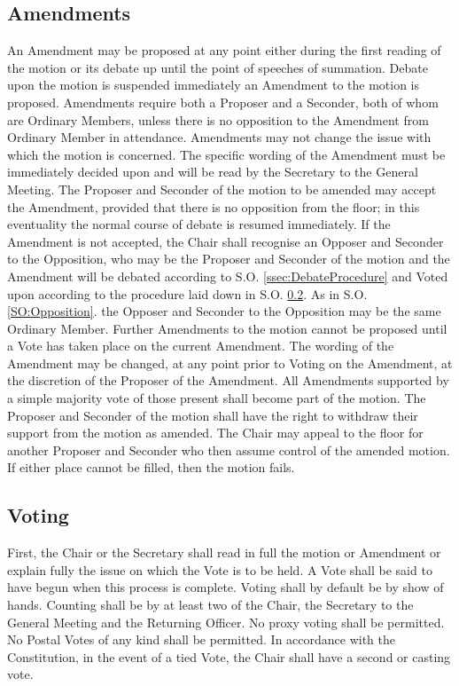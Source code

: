 \subsection{Amendments} \label{ssec:MotionAmendment}
\npara An Amendment may be proposed at any point either during the first reading of the motion or its debate up until the point of speeches of summation.
\npara Debate upon the motion is suspended immediately an Amendment to the motion is proposed.
\npara Amendments require both a Proposer and a Seconder, both of whom are Ordinary Members, unless there is no opposition to the Amendment from Ordinary Member in attendance.
\npara Amendments may not change the issue with which the motion is concerned.
\npara The specific wording of the Amendment must be immediately decided upon and will be read by the Secretary to the General Meeting.
\npara The Proposer and Seconder of the motion to be amended may accept the Amendment, provided that there is no opposition from the floor; in this eventuality the normal course of debate is resumed immediately.
\npara If the Amendment is not accepted, the Chair shall recognise an Opposer and Seconder to the Opposition, who may be the Proposer and Seconder of the motion and the Amendment will be debated according to S.O. \ref{ssec:DebateProcedure} and Voted upon according to the procedure laid down in S.O. \ref{ssec:MotionVoting}.  As in S.O. \ref{SO:Opposition}. the Opposer and Seconder to the Opposition may be the same Ordinary Member.
\npara Further Amendments to the motion cannot be proposed until a Vote has taken place on the current Amendment.
\npara The wording of the Amendment may be changed, at any point prior to Voting on the Amendment, at the discretion of the Proposer of the Amendment.
\npara All Amendments supported by a simple majority vote of those present shall become part of the motion.
\npara The Proposer and Seconder of the motion shall have the right to withdraw their support from the motion as amended. The Chair may appeal to the floor for another Proposer and Seconder who then assume control of the amended motion.  If either place cannot be filled, then the motion fails.
\subsection{Voting} \label{ssec:MotionVoting}
\npara First, the Chair or the Secretary shall read in full the motion or Amendment or explain fully the issue on which the Vote is to be held. A Vote shall be said to have begun when this process is complete.
\npara Voting shall by default be by show of hands.
\npara Counting shall be by at least two of the Chair, the Secretary to the General Meeting and the Returning Officer.
\npara No proxy voting shall be permitted.
\npara No Postal Votes of any kind shall be permitted.
\npara In accordance with the Constitution, in the event of a tied Vote, the Chair shall have a second or casting vote.
